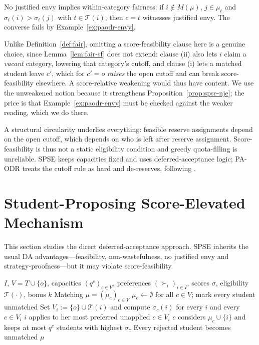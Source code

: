 \documentclass[runningheads]{llncs}
\newcommand{\T}{\mathcal{T}}
\begin{document}
No justified envy implies within-category fairness: if $i\notin M(\mu)$, $j\in\mu_t$ and $\sigma_t(i)>\sigma_t(j)$ with $t\in\T(i)$, then $c=t$ witnesses justified envy. The converse fails by Example~\ref{ex:paodr-envy}.

Unlike Definition~\ref{def:fair}, omitting a score-feasibility clause here is a genuine choice, since Lemma~\ref{lem:fair-sf} does not extend: clause (ii) also lets $i$ claim a \emph{vacant} category, lowering that category's cutoff, and clause (i) lets a matched student leave $c'$, which for $c'=o$ \emph{raises} the open cutoff and can break score-feasibility elsewhere. A score-relative weakening would thus have content. We use the unweakened notion because it strengthens Proposition~\ref{prop:spse-nje}; the price is that Example~\ref{ex:paodr-envy} must be checked against the weaker reading, which we do there.

A structural circularity underlies everything: feasible reserve assignments depend on the open cutoff, which depends on who is left after reserve assignment. Score-feasibility is thus not a static eligibility condition and greedy quota-filling is unreliable. SPSE keeps capacities fixed and uses deferred-acceptance logic; PA-ODR treats the cutoff rule as hard and de-reserves, following \cite{AyTu23a}.

\section{Student-Proposing Score-Elevated Mechanism}
\label{sec:spse}

This section studies the direct deferred-acceptance approach. SPSE inherits the usual DA advantages---feasibility, non-wastefulness, no justified envy and strategy-proofness---but it may violate score-feasibility.

\begin{algorithm}[t]
\caption{Student-Proposing Score-Elevated Mechanism (SPSE)}
\label{alg:spse}
\begin{algorithmic}[1]
\Require $I$, $V=T\cup\{o\}$, capacities $(q^c)_{c\in V}$, preferences $(\succ_i)_{i\in I}$, scores $\sigma$, eligibility $\T(\cdot)$, bonus $k$
\Ensure Matching $\mu=(\mu_c)_{c\in V}$
\State $\mu_c\gets\emptyset$ for all $c\in V$; mark every student unmatched
\State Set $V_i:=\{o\}\cup\T(i)$ and compute $\sigma_c(i)$ for every $i$ and every $c\in V_i$
    \State $i$ applies to her most preferred unapplied $c\in V_i$
    \State $c$ considers $\mu_c\cup\{i\}$ and keeps at most $q^c$ students with highest $\sigma_c$
    \State Every rejected student becomes unmatched
\EndWhile
\State \Return $\mu$
\end{algorithmic}
\end{algorithm}
\end{document}
